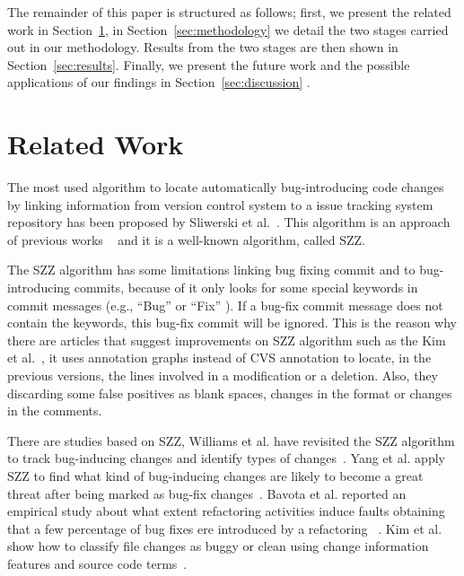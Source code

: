\documentclass[ifip]{svmult}
\begin{document}
The remainder of this paper is structured as follows; first, we present the related work in Section~\ref{sec:related}, in Section~\ref{sec:methodology} we detail the two stages carried out in our methodology. Results from the two stages are then shown in Section~\ref{sec:results}. Finally, we present the future work and the possible applications of our findings in Section~\ref{sec:discussion} .

\section{Related Work}
\label{sec:related}

The most used algorithm to locate automatically bug-introducing code changes by linking information from version control system to a issue tracking system repository has been proposed by Sliwerski et al.~\cite{sliwerski2005changes}. This algorithm is an approach of previous works ~\cite{vcubranic2003hipikat,fischer2003analyzing,fischer2003populating} and it is a well-known algorithm, called SZZ.

The SZZ algorithm has some limitations linking bug fixing commit and to bug-introducing commits, because of it only looks for some special keywords in commit messages (e.g., ``Bug'' or ``Fix'' \cite{kamei2007effects}). If a bug-fix commit message does not contain the keywords, this bug-fix commit will be ignored. This is the reason why there are articles that suggest improvements on SZZ algorithm such as the Kim et al.~\cite{kim2006automatic}, it uses annotation graphs instead of CVS annotation to locate, in the previous versions, the lines involved in a modification or a deletion. Also, they discarding some false positives as blank spaces, changes in the format or changes in the comments.

There are studies based on SZZ, Williams et al. have revisited the SZZ algorithm to track bug-inducing changes and identify types of changes~\cite{williams2008szz}. Yang et al. apply SZZ to find what kind of bug-inducing changes are likely to become a great threat after being marked as bug-fix changes~\cite{yangbug}. Bavota et al. reported an empirical study about what extent refactoring activities induce faults obtaining that a few percentage of bug fixes ere introduced by a refactoring ~\cite{bavota2012does}. Kim et al. show how to classify file changes as buggy or clean using change information features and source code terms~\cite{kim2008classifying}.
\end{document}

